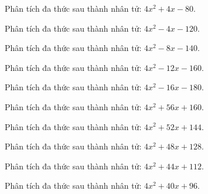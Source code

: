 \begin{bt}
	Phân tích đa thức sau thành nhân tử: $4 x^2 + 4 x - 80$.
\end{bt}
\begin{bt}
	Phân tích đa thức sau thành nhân tử: $4 x^2 - 4 x - 120$.
\end{bt}
\begin{bt}
	Phân tích đa thức sau thành nhân tử: $4 x^2 - 8 x - 140$.
\end{bt}
\begin{bt}
	Phân tích đa thức sau thành nhân tử: $4 x^2 - 12 x - 160$.
\end{bt}
\begin{bt}
	Phân tích đa thức sau thành nhân tử: $4 x^2 - 16 x - 180$.
\end{bt}
\begin{bt}
	Phân tích đa thức sau thành nhân tử: $4 x^2 + 56 x + 160$.
\end{bt}
\begin{bt}
	Phân tích đa thức sau thành nhân tử: $4 x^2 + 52 x + 144$.
\end{bt}
\begin{bt}
	Phân tích đa thức sau thành nhân tử: $4 x^2 + 48 x + 128$.
\end{bt}
\begin{bt}
	Phân tích đa thức sau thành nhân tử: $4 x^2 + 44 x + 112$.
\end{bt}
\begin{bt}
	Phân tích đa thức sau thành nhân tử: $4 x^2 + 40 x + 96$.
\end{bt}
